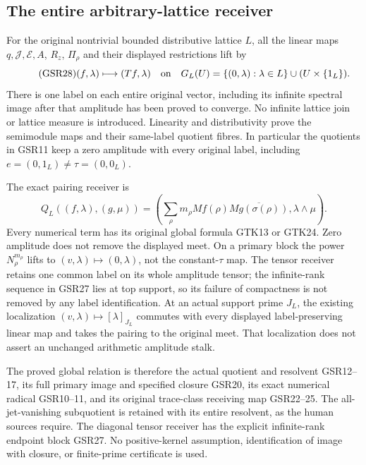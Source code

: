 \subsection{The entire arbitrary-lattice receiver}

For the original nontrivial
bounded distributive lattice
$L$, all the linear maps
$q,\mathcal J,\mathcal E,A$,
$R_z$, $\Pi_\rho$ and their
displayed restrictions lift
by
\begin{equation}\tag{GSR28}
 (f,\lambda)\longmapsto(Tf,\lambda)
      \quad\hbox{on}\quad
 G_L(U)=\{(0,\lambda):\lambda\in L\}
                       \cup(U\times\{1_L\}).
\end{equation}
There is one label on each
entire original vector,
including its infinite
spectral image after that
amplitude has been proved
to converge. No infinite
lattice join or lattice
measure is introduced.
Linearity and distributivity
prove the semimodule maps
and their same-label
quotient fibres. In
particular the quotients
in GSR11 keep a zero
amplitude with every
original label, including
$e=(0,1_L)\ne\tau=(0,0_L)$.

The exact pairing receiver is
\begin{equation}\tag{GSR29}
 Q_L((f,\lambda),(g,\mu))
   =\left(\sum_\rho m_\rho Mf(\rho)
           \overline{Mg(\sigma(\rho))},
                                    \lambda\wedge\mu\right).
\end{equation}
Every numerical term has
its original global formula
GTK13 or GTK24. Zero
amplitude does not remove
the displayed meet.
On a primary block the
power $N_\rho^{m_\rho}$
lifts to $(v,\lambda)\mapsto
(0,\lambda)$, not the
constant-$\tau$ map.
The tensor receiver retains
one common label on its
whole amplitude tensor;
the infinite-rank sequence
in GSR27 lies at top
support, so its failure
of compactness is not
removed by any label
identification. At an
actual support prime $J_L$,
the existing localization
$(v,\lambda)\mapsto[\lambda]_{J_L}$
commutes with every displayed
label-preserving linear map
and takes the pairing to
the original meet. That
localization does not
assert an unchanged
arithmetic amplitude stalk.

The proved global relation is
therefore the actual quotient
and resolvent GSR12--17,
its full primary image and
specified closure GSR20,
its exact numerical radical
GSR10--11, and its original
trace-class receiving map
GSR22--25. The all-jet-vanishing
subquotient is retained with
its entire resolvent, as the
human sources require.
The diagonal tensor receiver
has the explicit infinite-rank
endpoint block GSR27.
No positive-kernel assumption,
identification of image with
closure, or finite-prime
certificate is used.
